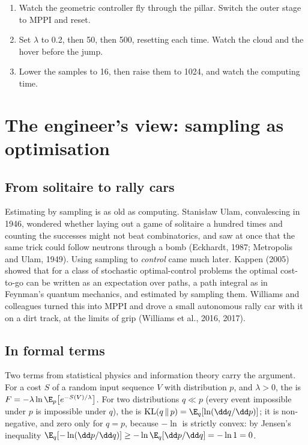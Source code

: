 \begin{trythis}
\begin{enumerate}
  \item Watch the geometric controller fly through the pillar. Switch the outer stage to MPPI and reset.
  \item Set $\lambda$ to 0.2, then 50, then 500, resetting each time. Watch the cloud and the hover before the jump.
  \item Lower the samples to 16, then raise them to 1024, and watch the computing time.
\end{enumerate}
\end{trythis}

\section{The engineer's view: sampling as optimisation}

\subsection{From solitaire to rally cars}
Estimating by sampling is as old as computing. Stanisław Ulam, convalescing in 1946, wondered whether laying out a game of solitaire a hundred times and counting the successes might not beat combinatorics, and saw at once that the same trick could follow neutrons through a bomb (Eckhardt, 1987; Metropolis and Ulam, 1949). Using sampling to \emph{control} came much later. Kappen (2005) showed that for a class of stochastic optimal-control problems the optimal cost-to-go can be written as an expectation over paths, a path integral as in Feynman's quantum mechanics, and estimated by sampling them. Williams and colleagues turned this into MPPI and drove a small autonomous rally car with it on a dirt track, at the limits of grip (Williams et al., 2016, 2017).

\subsection{In formal terms}

Two terms from statistical physics and information theory carry the argument. For a cost $S$ of a random input sequence $V$ with distribution $p$, and $\lambda > 0$, the  is $F = -\lambda\ln\E_p\big[e^{-S(V)/\lambda}\big]$. For two distributions $q \ll p$ (every event impossible under $p$ is impossible under $q$), the  is $\mathrm{KL}(q\,\|\,p) = \E_q[\ln(\dd q/\dd p)]$; it is non-negative, and zero only for $q = p$, because $-\ln$ is strictly convex: by Jensen's inequality $\E_q[-\ln(\dd p/\dd q)] \ge -\ln\E_q[\dd p/\dd q] = -\ln 1 = 0$.


